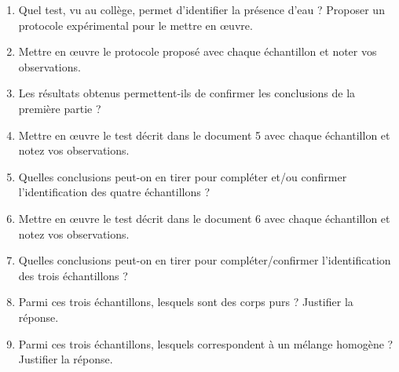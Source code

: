 \documentclass[a4paper,11pt,fleqn]{article}%
\begin{document}
\begin{enumerate}[resume]
	\item Quel test, vu au collège, permet d’identifier la présence d’eau ? Proposer un protocole expérimental pour le mettre en \oe uvre.
	\item Mettre en \oe uvre le protocole proposé avec chaque  échantillon et noter vos observations.
    \item Les résultats obtenus permettent-ils de confirmer les conclusions de la première partie ?
    \item Mettre en œuvre le test décrit dans le document 5 avec chaque  échantillon et notez vos observations.
    \item Quelles conclusions peut-on en tirer pour compléter et/ou confirmer l’identification des quatre échantillons ?
    \item Mettre en œuvre le test décrit dans le document 6 avec chaque  échantillon et notez vos observations.
    \item Quelles conclusions peut-on en tirer pour compléter/confirmer l’identification des trois échantillons ?
    \item Parmi ces trois échantillons, lesquels sont des corps purs ? Justifier la réponse.
    \item Parmi ces trois échantillons, lesquels correspondent à un mélange homogène ? Justifier la réponse.
\end{enumerate}
\end{document}

